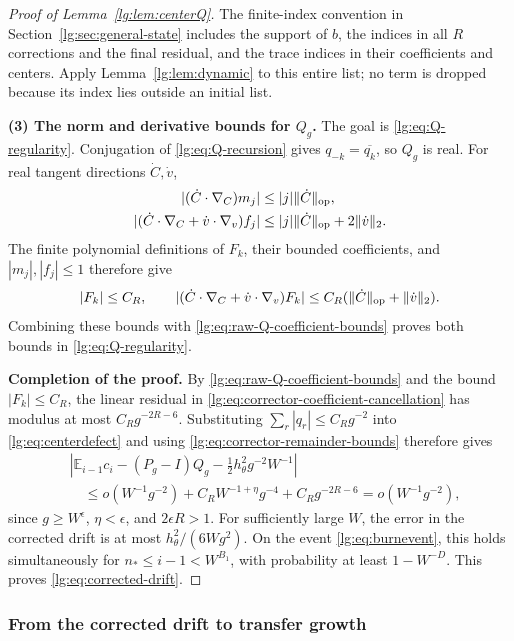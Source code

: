 \documentclass[11pt]{article}
\numberwithin{equation}{section}
\theoremstyle{remark}
\newcommand{\E}{\mathbb E}
\begin{document}
\begin{proof}[Proof of Lemma~\ref{lg:lem:centerQ}]
The finite-index convention in Section~\ref{lg:sec:general-state}
includes the support of $b$, the indices in all $R$ corrections
and the final residual, and the trace indices in their coefficients
and centers. Apply Lemma~\ref{lg:lem:dynamic} to this entire list;
no term is dropped because its index lies outside an initial list.

\noindent\textbf{(3) The norm and derivative bounds for $Q_g$.}
The goal is \eqref{lg:eq:Q-regularity}.
Conjugation of \eqref{lg:eq:Q-recursion} gives
$q_{-k}=\overline{q_k}$, so $Q_g$ is real.
For real tangent directions $\dot C,\dot v$,
\[
 \begin{aligned}
 |(\dot C\cdot\nabla_C)m_j|&\le |j|\|\dot C\|_{\rm op},\\
 |(\dot C\cdot\nabla_C+\dot v\cdot\nabla_v)f_j|
 &\le |j|\|\dot C\|_{\rm op}+2\|\dot v\|_2.
 \end{aligned}
\]
The finite polynomial definitions of $F_k$, their bounded
coefficients, and $|m_j|,|f_j|\le1$ therefore give
\[
 |F_k|\le C_R,\qquad
 |(\dot C\cdot\nabla_C+\dot v\cdot\nabla_v)F_k|
 \le C_R(\|\dot C\|_{\rm op}+\|\dot v\|_2).
\]
Combining these bounds with
\eqref{lg:eq:raw-Q-coefficient-bounds} proves both bounds in
\eqref{lg:eq:Q-regularity}.

\noindent\textbf{Completion of the proof.}
By \eqref{lg:eq:raw-Q-coefficient-bounds} and the bound $|F_k|\le C_R$,
the linear residual in \eqref{lg:eq:corrector-coefficient-cancellation}
has modulus at most $C_Rg^{-2R-6}$.
Substituting $\sum_r|q_r|\le C_Rg^{-2}$ into
\eqref{lg:eq:centerdefect} and using
\eqref{lg:eq:corrector-remainder-bounds} therefore gives
\begin{equation}\label{lg:eq:smalldefect}
 \begin{aligned}
 &\left|\E_{i-1}c_i-(P_g-I)Q_g
       -\tfrac12h_\theta^2g^{-2}W^{-1}\right|\\
 &\quad\le o(W^{-1}g^{-2})+C_RW^{-1+\eta}g^{-4}
       +C_Rg^{-2R-6}=o(W^{-1}g^{-2}),
 \end{aligned}
\end{equation}
since $g\ge W^\epsilon$, $\eta<\epsilon$, and $2\epsilon R>1$.
For sufficiently large $W$, the error
in the corrected drift is at most $h_\theta^2/(6Wg^2)$.
On the event \eqref{lg:eq:burnevent}, this holds simultaneously for
$n_*\le i-1<W^{B_1}$, with probability at least $1-W^{-D}$.
This proves \eqref{lg:eq:corrected-drift}.
\end{proof}

\subsubsection{From the corrected drift to transfer growth}
\end{document}
